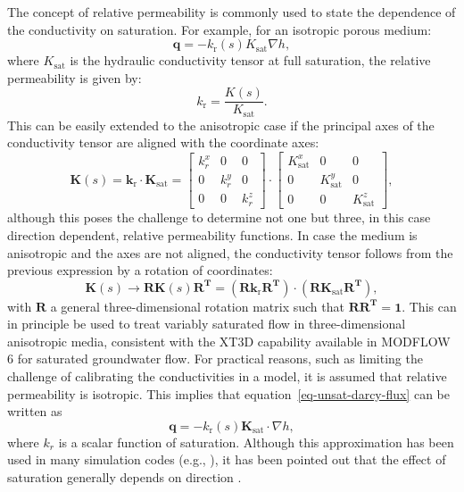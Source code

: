 \documentclass[fleqn]{article}
\begin{document}
The concept of relative permeability is commonly used to
state the dependence of the conductivity on saturation. For
example, for an isotropic porous medium:
\begin{equation}
  \mathbf{q} = - k_\textrm{r}(s) K_{\textrm{sat}} \nabla h,
\end{equation}
where $K_\textrm{sat}$ is the hydraulic conductivity tensor at full saturation,
the relative permeability is given by:
\begin{equation}
  k_\textrm{r} = \frac{K(s)}{K_{\textrm{sat}}}.
\end{equation}
This can be easily extended to the anisotropic case if the principal axes
of the conductivity tensor are aligned with the coordinate axes:
\begin{equation}
  \mathbf{K}(s) = \mathbf{k}_{\textrm{r}} \cdot \mathbf{K}_{\textrm{sat}}
                = 
                \begin{bmatrix}
                  k_r^x & 0 & 0 \\
                  0 & k_r^y & 0 \\
                  0 & 0 & k_r^z
                \end{bmatrix} \cdot
                \begin{bmatrix}
                  K_{\text{sat}}^x & 0 & 0 \\
                  0 & K_{\text{sat}}^y & 0 \\
                  0 & 0 & K_{\text{sat}}^z
                \end{bmatrix},
\end{equation}
although this poses the challenge to determine not one but three, in
this case direction dependent, relative permeability functions. In case the 
medium is anisotropic and the axes are not aligned, the conductivity tensor
follows from the previous expression by a rotation of coordinates:
\begin{equation}
  \mathbf{K}(s) \rightarrow \mathbf{R} \mathbf{K}(s) \mathbf{R^T}
                = (\mathbf{R} \mathbf{k}_{\textrm{r}} \mathbf{R^T}) \cdot 
                  (\mathbf{R} \mathbf{K}_{\textrm{sat}} \mathbf{R^T}),
\end{equation}
with $\mathbf{R}$ a general three-dimensional rotation matrix such that
$\mathbf{R}\mathbf{R^T} = \mathbf{1}$. This can in principle be used
to treat variably saturated flow in three-dimensional anisotropic media,
consistent with the XT3D capability \cite{modflow6xt3d} available in
MODFLOW 6 for saturated groundwater flow. For practical reasons, such
as limiting the challenge of calibrating the conductivities in a model,
it is assumed that relative permeability is isotropic. This
implies that equation~\ref{eq-unsat-darcy-flux} can be written as
\begin{equation}
  \mathbf{q} = - k_\text{r}(s) \mathbf{K}_{\textrm{sat}} \cdot \nabla h,
\end{equation}
where $k_r$ is a scalar function of saturation. Although this approximation
has been used in many simulation codes 
(e.g., \cite{vs2d,modflowvsf,vosssutra,panday-surfact}), it has been
pointed out that the effect of saturation generally depends on 
direction \cite{bear-1987}.
\end{document}
